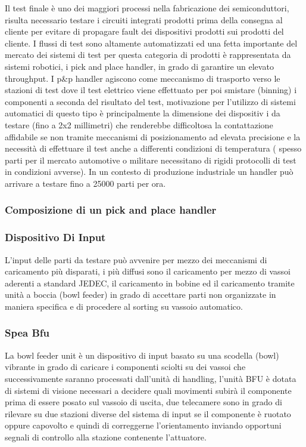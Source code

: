 Il test finale è uno dei maggiori processi nella fabricazione dei semiconduttori, risulta necessario testare  i circuiti integrati prodotti prima della consegna al cliente per evitare di propagare fault dei dispositivi prodotti sui prodotti del cliente. 
I flussi di test sono altamente automatizzati ed una fetta importante del mercato dei sistemi di test per 
questa categoria di prodotti è rappresentata da sistemi robotici, i pick and place handler, in grado di 
garantire un elevato throughput. 
I p\&p handler agiscono come meccanismo di trasporto verso le stazioni di test dove il test elettrico viene 
effettuato per poi smistare (binning) i componenti a seconda del risultato del test, motivazione per 
l’utilizzo di sistemi automatici di questo tipo è principalmente la dimensione dei dispositiv i da testare (fino a 2x2 millimetri) che renderebbe difficoltosa la contattazione affidabile se non tramite meccanismi di 
posizionamento ad elevata precisione e la necessità di effettuare il test anche a differenti condizioni di temperatura ( spesso parti per il mercato automotive o militare necessitano di rigidi protocolli di test in 
condizioni avverse). In un contesto di produzione industriale un handler può arrivare a testare fino a 
25000 parti per ora. 

\subsubsection{Composizione di un pick and place handler }

\subsubsection{Dispositivo Di Input }
L’input delle parti da testare può avvenire per mezzo dei meccanismi di caricamento più disparati, i più 
diffusi sono il caricamento per mezzo di vassoi aderenti a standard JEDEC, il caricamento in bobine ed il 
caricamento tramite unità a boccia (bowl feeder) in grado di accettare parti non organizzate in maniera 
specifica e di procedere al sorting su vassoio automatico.  

\subsubsection{Spea Bfu} 

La bowl feeder unit è un dispositivo di input basato su una scodella (bowl) vibrante in grado di caricare i 
componenti sciolti su dei vassoi che successivamente saranno processati dall’unità di handling, l’unità BFU 
è dotata di sistemi di visione necessari a decidere quali movimenti subirà il componente prima di essere 
posato sul vassoio di uscita, due telecamere sono in grado di rilevare su due stazioni diverse del sistema 
di input se il componente è ruotato oppure capovolto e quindi di correggerne l’orientamento inviando 
opportuni segnali di controllo alla stazione contenente l’attuatore.  

